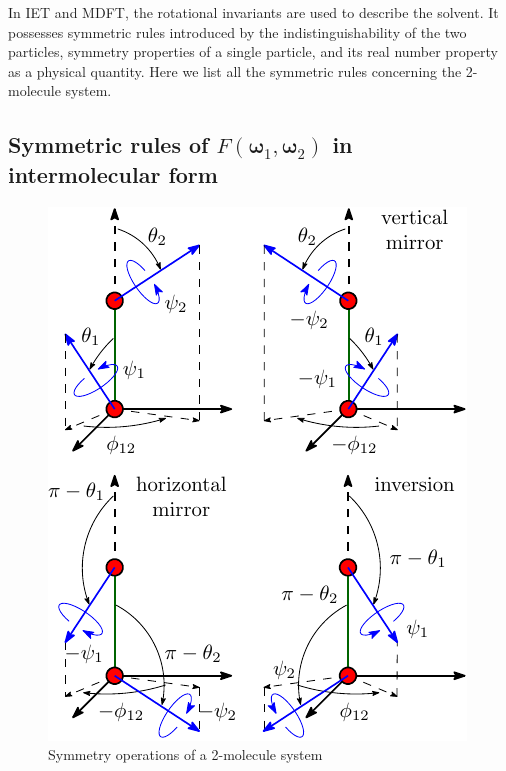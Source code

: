 In \acs{IET} and \acs{MDFT}, the rotational invariants are used
to describe the solvent. It possesses symmetric rules introduced by
the indistinguishability of the two particles, symmetry properties
of a single particle, and its real number property as a physical quantity.
Here we list all the symmetric rules concerning the 2-molecule system.

\subsection{Symmetric rules of $F(\boldsymbol{\omega}_{1},\boldsymbol{\omega}_{2})$
in intermolecular form\label{subsec:Symmetric-dcf}}

\begin{figure}[h]
\begin{centering}
\includegraphics{_figure/symmetry_dcf}
\par\end{centering}
\caption{Symmetry operations of a 2-molecule system\label{fig:Symmetry-operations}}
\end{figure}

